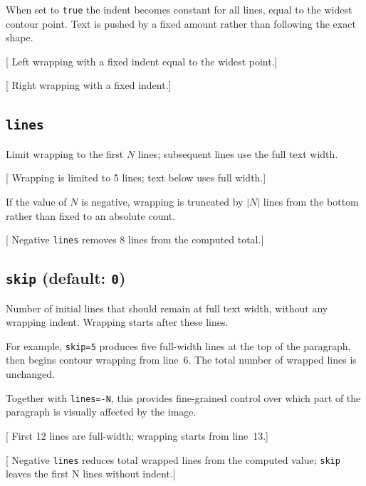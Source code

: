 \documentclass{article}
\begin{document}
When set to \texttt{true} the indent becomes constant for all lines,
equal to the widest contour point.  Text is pushed by a fixed amount
rather than following the exact shape.

[
  Left wrapping with a fixed indent equal to the widest point.]

[
  Right wrapping with a fixed indent.]

\subsection{\texttt{lines}}\label{macro:lines}

Limit wrapping to the first $N$ lines; subsequent lines use the full
text width.

[
  Wrapping is limited to 5 lines; text below uses full width.]

If the value of $N$ is negative, wrapping is truncated by $|N|$ lines
from the bottom rather than fixed to an absolute count.

[
  Negative \texttt{lines} removes 8 lines from the computed total.]

\subsection{\texttt{skip} (default: \texttt{0})}\label{macro:skip}

Number of initial lines that should remain at full text width,
without any wrapping indent.  Wrapping starts after these lines.

For example, \texttt{skip=5} produces five full-width lines at the
top of the paragraph, then begins contour wrapping from line~6.
The total number of wrapped lines is unchanged.

Together with \texttt{lines=-N}, this provides fine-grained control
over which part of the paragraph is visually affected by the image.

[
  First 12 lines are full-width; wrapping starts from line~13.]

[
  Negative \texttt{lines} reduces total wrapped lines from the computed
  value; \texttt{skip} leaves the first N lines without indent.]
\end{document}
